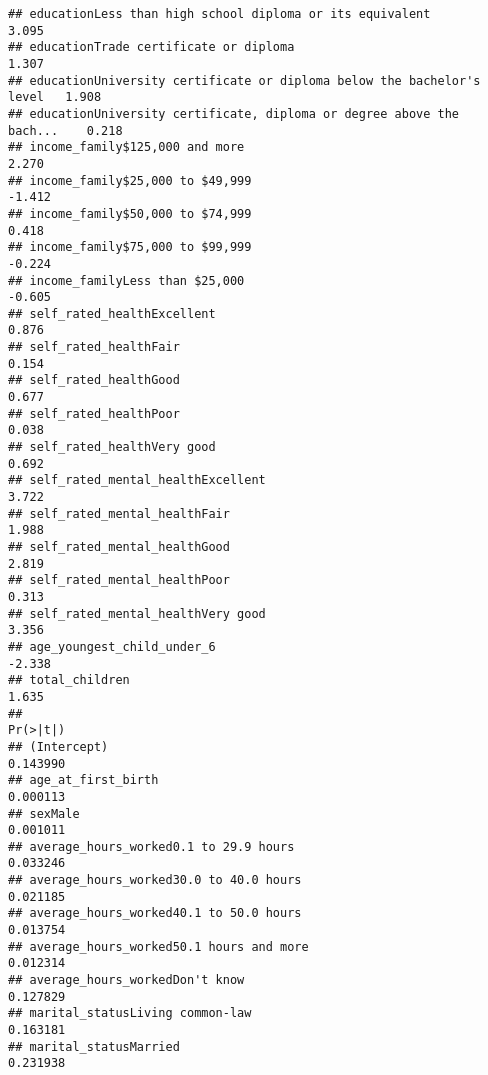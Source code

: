 \documentclass[
]{article}
\begin{document}
\begin{verbatim}
## educationLess than high school diploma or its equivalent                3.095
## educationTrade certificate or diploma                                   1.307
## educationUniversity certificate or diploma below the bachelor's level   1.908
## educationUniversity certificate, diploma or degree above the bach...    0.218
## income_family$125,000 and more                                          2.270
## income_family$25,000 to $49,999                                        -1.412
## income_family$50,000 to $74,999                                         0.418
## income_family$75,000 to $99,999                                        -0.224
## income_familyLess than $25,000                                         -0.605
## self_rated_healthExcellent                                              0.876
## self_rated_healthFair                                                   0.154
## self_rated_healthGood                                                   0.677
## self_rated_healthPoor                                                   0.038
## self_rated_healthVery good                                              0.692
## self_rated_mental_healthExcellent                                       3.722
## self_rated_mental_healthFair                                            1.988
## self_rated_mental_healthGood                                            2.819
## self_rated_mental_healthPoor                                            0.313
## self_rated_mental_healthVery good                                       3.356
## age_youngest_child_under_6                                             -2.338
## total_children                                                          1.635
##                                                                       Pr(>|t|)
## (Intercept)                                                           0.143990
## age_at_first_birth                                                    0.000113
## sexMale                                                               0.001011
## average_hours_worked0.1 to 29.9 hours                                 0.033246
## average_hours_worked30.0 to 40.0 hours                                0.021185
## average_hours_worked40.1 to 50.0 hours                                0.013754
## average_hours_worked50.1 hours and more                               0.012314
## average_hours_workedDon't know                                        0.127829
## marital_statusLiving common-law                                       0.163181
## marital_statusMarried                                                 0.231938

\end{verbatim}
\end{document}
